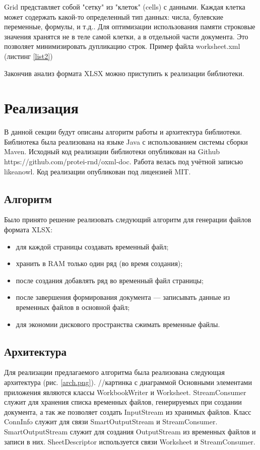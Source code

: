 \documentclass[14pt]{matmex-diploma}
\begin{document}
Grid представляет собой "сетку" из "клеток" (cells) с данными. Каждая клетка может содержать какой-то определенный тип данных: числа, булевские переменные, формулы, и т.д.. Для оптимизации использования памяти строковые значения хранятся не в теле самой клетки, а в отдельной части документа. Это позволяет минимизировать дупликацию строк. Пример файла worksheet.xml (листинг \ref{list2})

Закончив анализ формата XLSX можно приступить к реализации библиотеки.
\section{Реализация}
В данной секции будут описаны алгоритм работы и архитектура библиотеки. Библиотека была реализована на языке Java с использованием системы сборки Maven. Исходный код реализации библиотеки опубликован на Github https://github.com/protei-rnd/oxml-doc. Работа велась под учётной записью likeanowl. Код реализации опубликован под лицензией MIT.
\subsection{Алгоритм}
Было принято решение реализовать следующий алгоритм для генерации файлов формата XLSX:
\begin{itemize}
    \item для каждой страницы создавать временный файл;
    \item хранить в RAM только один ряд (во время создания);
    \item после создания добавлять ряд во временный файл страницы;
    \item после завершения формирования документа --- записывать данные из временных файлов в основной файл;
    \item для экономии дискового пространства сжимать временные файлы.
\end{itemize}

\subsection{Архитектура}
Для реализации предлагаемого алгоритма была реализована следующая архитектура (рис. \ref{arch.png}).
//картинка с диаграммой
Основными элементами приложения являются классы WorkbookWriter и Worksheet. StreamConsumer служит для хранения списка временных файлов, генерируемых при создании документа, а так же позволяет создать InputStream из хранимых файлов. Класс ConnInfo служит для связи SmartOutputStream и StreamConsumer. SmartOutputStream служит для создания OutputStream из временных файлов и записи в них. SheetDescriptor используется связи Worksheet и StreamConsumer. 
\end{document}
